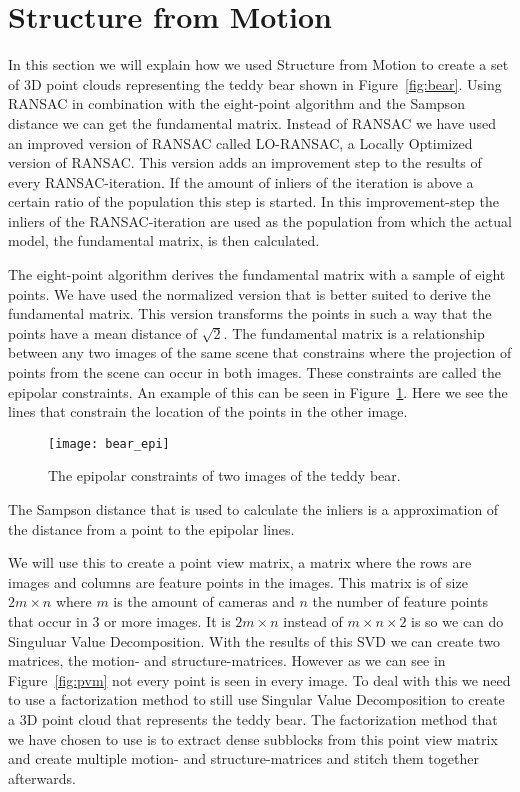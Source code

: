 \section{Structure from Motion}
\label{structure}
In this section we will explain how we used Structure from Motion\cite{SfM} to create a set of 3D point clouds
representing the teddy bear shown in Figure~\ref{fig:bear}.
Using RANSAC\cite{ransac} in combination with the eight-point algorithm\cite{eightpoint} and the Sampson distance we can get the fundamental matrix.
Instead of RANSAC we have used an improved version of RANSAC called LO-RANSAC, a Locally Optimized version of RANSAC.
This version adds an improvement step to the results of every RANSAC-iteration. If the amount of inliers of the iteration is above a certain ratio of the population this step is started.
In this improvement-step the inliers of the RANSAC-iteration are used as the population from which the actual model, the fundamental matrix, is then calculated.

The eight-point algorithm derives the fundamental matrix with a sample of eight points.
We have used the normalized version that is better suited to derive the fundamental matrix.
This version transforms the points in such a way that the points have a mean distance of $\sqrt{2}$.
The fundamental matrix is a relationship between any two images of the same scene that constrains where the projection of points from the scene can occur in both images.
These constraints are called the epipolar constraints.
An example of this can be seen in Figure~\ref{fig:epipolar}.
Here we see the lines that constrain the location of the points in the other image.
\begin{figure}[ht]
	\centering
	\texttt{[image: bear\_epi]}
	\caption{The epipolar constraints of two images of the teddy bear.}
	\label{fig:epipolar}
\end{figure}

The Sampson distance that is used to calculate the inliers is a approximation of the distance from a point to the epipolar lines.

We will use this to create a point view matrix, a matrix where the rows are images and columns are feature points in the images.
This matrix is of size $2m \times n$ where $m$ is the amount of cameras and $n$ the number of feature points that occur in 3 or more images. 
It is $2m \times n$ instead of $m \times n \times 2$ is so we can do Singuluar Value Decomposition.
With the results of this SVD we can create two matrices, the motion- and structure-matrices.
However as we can see in Figure~\ref{fig:pvm} not every point is seen in every image.
To deal with this we need to use a factorization method to still use Singular Value Decomposition to create a 3D point cloud that represents the teddy bear.
The factorization method that we have chosen to use is to extract dense subblocks from this point view matrix  and create multiple motion- and structure-matrices and stitch them together afterwards.


